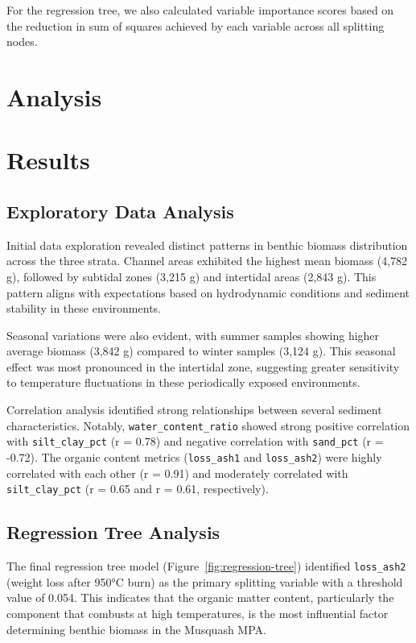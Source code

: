 \documentclass[12pt]{article}
\begin{document}
\qquad For the regression tree, we also calculated variable importance scores based on the reduction in sum of squares achieved by each variable across all splitting nodes.

\newpage
\section{Analysis}


\newpage
\section{Results}
\subsection{Exploratory Data Analysis}

\qquad Initial data exploration revealed distinct patterns in benthic biomass distribution across the three strata. Channel areas exhibited the highest mean biomass (4,782 g), followed by subtidal zones (3,215 g) and intertidal areas (2,843 g). This pattern aligns with expectations based on hydrodynamic conditions and sediment stability in these environments.

\qquad Seasonal variations were also evident, with summer samples showing higher average biomass (3,842 g) compared to winter samples (3,124 g). This seasonal effect was most pronounced in the intertidal zone, suggesting greater sensitivity to temperature fluctuations in these periodically exposed environments.

\qquad Correlation analysis identified strong relationships between several sediment characteristics. Notably, \texttt{water\_content\_ratio} showed strong positive correlation with \texttt{silt\_clay\_pct} (r = 0.78) and negative correlation with \texttt{sand\_pct} (r = -0.72). The organic content metrics (\texttt{loss\_ash1} and \texttt{loss\_ash2}) were highly correlated with each other (r = 0.91) and moderately correlated with \texttt{silt\_clay\_pct} (r = 0.65 and r = 0.61, respectively).

\subsection{Regression Tree Analysis}

The final regression tree model (Figure~\ref{fig:regression-tree}) identified \texttt{loss\_ash2} (weight loss after 950°C burn) as the primary splitting variable with a threshold value of 0.054. This indicates that the organic matter content, particularly the component that combusts at high temperatures, is the most influential factor determining benthic biomass in the Musquash MPA.
\end{document}
